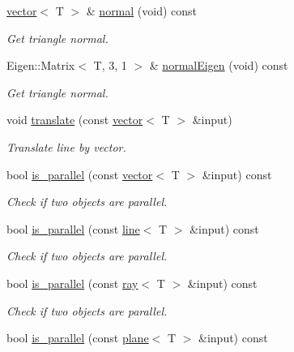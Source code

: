 \begin{DoxyCompactItemize}
\hyperlink{classddd_1_1vector}{vector}$<$ T $>$ \& \hyperlink{classddd_1_1triangle_a1a45e08178b427aec00868271f664273}{normal} (void) const
\begin{DoxyCompactList}\small\item\em Get triangle normal. \end{DoxyCompactList}\item 
\mbox{\label{classddd_1_1triangle_a3e933880daa0317e2f5a1a6fa702b0dc}} 
Eigen\+::\+Matrix$<$ T, 3, 1 $>$ \& \hyperlink{classddd_1_1triangle_a3e933880daa0317e2f5a1a6fa702b0dc}{normal\+Eigen} (void) const
\begin{DoxyCompactList}\small\item\em Get triangle normal. \end{DoxyCompactList}\item 
void \hyperlink{classddd_1_1triangle_a8f763fc90af4be50a284ad99020bb746}{translate} (const \hyperlink{classddd_1_1vector}{vector}$<$ T $>$ \&input)
\begin{DoxyCompactList}\small\item\em Translate line by vector. \end{DoxyCompactList}\item 
bool \hyperlink{classddd_1_1triangle_ad12c87bf60bd5754643a430e3849332e}{is\+\_\+parallel} (const \hyperlink{classddd_1_1vector}{vector}$<$ T $>$ \&input) const
\begin{DoxyCompactList}\small\item\em Check if two objects are parallel. \end{DoxyCompactList}\item 
bool \hyperlink{classddd_1_1triangle_a49f8deab2e4e94b563f92a9c8d752fe8}{is\+\_\+parallel} (const \hyperlink{classddd_1_1line}{line}$<$ T $>$ \&input) const
\begin{DoxyCompactList}\small\item\em Check if two objects are parallel. \end{DoxyCompactList}\item 
bool \hyperlink{classddd_1_1triangle_af3ef3664c5607056410abc1138e51f8f}{is\+\_\+parallel} (const \hyperlink{classddd_1_1ray}{ray}$<$ T $>$ \&input) const
\begin{DoxyCompactList}\small\item\em Check if two objects are parallel. \end{DoxyCompactList}\item 
bool \hyperlink{classddd_1_1triangle_af3ba7a91cfe813cadb2dac7f6d47cb99}{is\+\_\+parallel} (const \hyperlink{classddd_1_1plane}{plane}$<$ T $>$ \&input) const

\end{DoxyCompactItemize}
